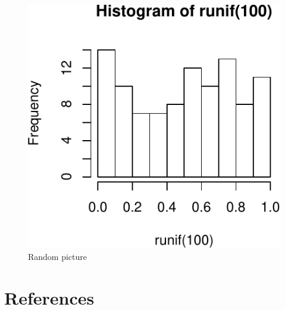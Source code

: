\documentclass[]{article}
\begin{document}
\begin{figure}
\centering
\includegraphics{main_files/figure-latex/random-1.pdf}
\caption{\label{pic1}Random picture}
\end{figure}

\hypertarget{references}{%
\section{References}\label{references}}
\end{document}
